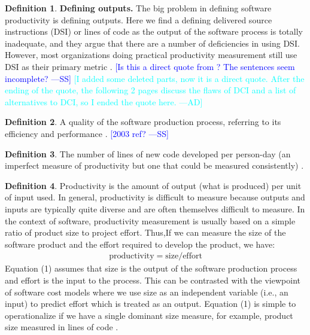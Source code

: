 \documentclass[letterpaper, cleveref]{lipics-v2019}
\newcommand{\authornote}[3]{\textcolor{#1}{[#3 ---#2]}}
\newcommand{\authornote}[3]{}
\newcommand{\wss}[1]{\authornote{blue}{SS}{#1}} %
\newcommand{\ad}[1]{\authornote{cyan}{AD}{#1}} %
\theoremstyle{definition}
\newtheorem{defn}{Definition}
\begin{document}
\begin{defn}
\textbf{Defining outputs.} The big problem in defining software productivity is
defining outputs. Here we find a defining delivered source instructions (DSI) or
lines of code as the output of the software process is totally inadequate, and
they argue that there are a number of deficiencies in using DSI. However,
	most organizations doing practical productivity measurement still use DSI as
	their primary metric \citep{Boehm1987}. \wss{Is this a direct quote from
		\citet{Boehm1987}?  The sentences seem incomplete?}
\ad{I added some deleted parts, now it is a direct quote. After the ending of
the quote, the following 2 pages discuss the flaws of DCI and a list of
alternatives to DCI, so I ended the quote here.}
\end{defn}

\begin{defn}
  A quality of the software production process, referring to its efficiency
  and performance \citep{ghezzi1991fundamentals}.  \wss{2003 ref?}
\end{defn}

\begin{defn}
	\label{ProductivitySelected2} The number of lines of new code developed per
  person-day (an imperfect measure of productivity but one that could be
  measured consistently) \citep{MacCormack2003}.
\end{defn}

\begin{defn}
	\label{ProductivitySelected1} Productivity is the amount of output (what is
  produced) per unit of input used. In general, productivity is difficult to
  measure because outputs and inputs are typically quite diverse and are
  often themselves difficult to measure. In the context of software,
  productivity measurement is usually based on a simple ratio of product
  size to project effort. Thus,If we can measure the size of the software
  product and the effort required to develop the product, we have:
	\begin{align}
	\text{productivity} = \text{size}/\text{effort}
	\end{align}
  Equation (1) assumes that size is the output of the software production
  process and effort is the input to the process. This can be contrasted
  with the viewpoint of software cost models where we use size as an
  independent variable (i.e., an input) to predict effort which is treated
  as an output. Equation (1) is simple to operationalize if we have a single
  dominant size measure, for example, product size measured in lines of code
  \citep{Kitchenham2004}.
\end{defn}
\end{document}
